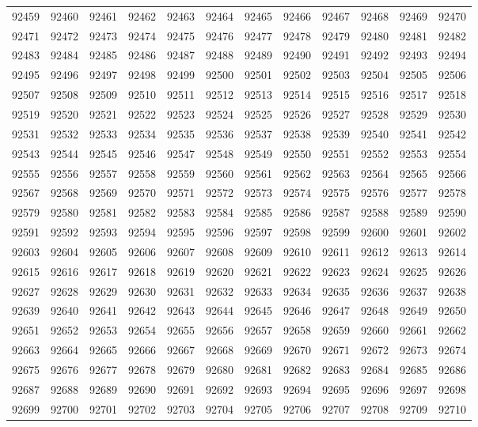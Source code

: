 \begin{center}
\begin{longtable}{llllllllllll}
92459 &92460 &92461 &92462 &92463 &92464 &92465 &92466 &92467 &92468 &92469 &92470 \\
92471 &92472 &92473 &92474 &92475 &92476 &92477 &92478 &92479 &92480 &92481 &92482 \\
92483 &92484 &92485 &92486 &92487 &92488 &92489 &92490 &92491 &92492 &92493 &92494 \\
92495 &92496 &92497 &92498 &92499 &92500 &92501 &92502 &92503 &92504 &92505 &92506 \\
92507 &92508 &92509 &92510 &92511 &92512 &92513 &92514 &92515 &92516 &92517 &92518 \\
92519 &92520 &92521 &92522 &92523 &92524 &92525 &92526 &92527 &92528 &92529 &92530 \\
92531 &92532 &92533 &92534 &92535 &92536 &92537 &92538 &92539 &92540 &92541 &92542 \\
92543 &92544 &92545 &92546 &92547 &92548 &92549 &92550 &92551 &92552 &92553 &92554 \\
92555 &92556 &92557 &92558 &92559 &92560 &92561 &92562 &92563 &92564 &92565 &92566 \\
92567 &92568 &92569 &92570 &92571 &92572 &92573 &92574 &92575 &92576 &92577 &92578 \\
92579 &92580 &92581 &92582 &92583 &92584 &92585 &92586 &92587 &92588 &92589 &92590 \\
92591 &92592 &92593 &92594 &92595 &92596 &92597 &92598 &92599 &92600 &92601 &92602 \\
92603 &92604 &92605 &92606 &92607 &92608 &92609 &92610 &92611 &92612 &92613 &92614 \\
92615 &92616 &92617 &92618 &92619 &92620 &92621 &92622 &92623 &92624 &92625 &92626 \\
92627 &92628 &92629 &92630 &92631 &92632 &92633 &92634 &92635 &92636 &92637 &92638 \\
92639 &92640 &92641 &92642 &92643 &92644 &92645 &92646 &92647 &92648 &92649 &92650 \\
92651 &92652 &92653 &92654 &92655 &92656 &92657 &92658 &92659 &92660 &92661 &92662 \\
92663 &92664 &92665 &92666 &92667 &92668 &92669 &92670 &92671 &92672 &92673 &92674 \\
92675 &92676 &92677 &92678 &92679 &92680 &92681 &92682 &92683 &92684 &92685 &92686 \\
92687 &92688 &92689 &92690 &92691 &92692 &92693 &92694 &92695 &92696 &92697 &92698 \\
92699 &92700 &92701 &92702 &92703 &92704 &92705 &92706 &92707 &92708 &92709 &92710 \\

\end{longtable}
\end{center}
